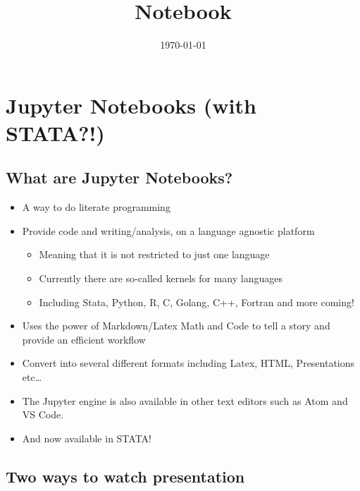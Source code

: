 \documentclass[10pt,parskip=half,
	toc=sectionentrywithdots,
	bibliography=totocnumbered,
	captions=tableheading,numbers=noendperiod]{scrartcl}
\providecommand{\tightlist}{%
  \setlength{\itemsep}{0pt}\setlength{\parskip}{0pt}}
\begin{document}
		\title{Notebook}
	\date{\today}
	\maketitle

		\begingroup
    \let\cleardoublepage\relax
    \let\clearpage\relax\tableofcontents
    \endgroup

\hypertarget{jupyter-notebooks-with-stata}{%
\section{Jupyter Notebooks (with
STATA?!)}\label{jupyter-notebooks-with-stata}}

\hypertarget{what-are-jupyter-notebooks}{%
\subsection{What are Jupyter
Notebooks?}\label{what-are-jupyter-notebooks}}

\begin{itemize}
\tightlist
\item
  A way to do literate programming
\item
  Provide code and writing/analysis, on a language agnostic platform

  \begin{itemize}
  \tightlist
  \item
    Meaning that it is not restricted to just one language
  \item
    Currently there are so-called kernels for many languages
  \item
    Including Stata, Python, R, C, Golang, C++, Fortran and more coming!
  \end{itemize}
\item
  Uses the power of Markdown/Latex Math and Code to tell a story and
  provide an efficient workflow
\item
  Convert into several different formats including Latex, HTML,
  Presentations etc\ldots{}
\item
  The Jupyter engine is also available in other text editors such as
  Atom and VS Code.
\item
  And now available in STATA!
\end{itemize}

\hypertarget{two-ways-to-watch-presentation}{%
\subsection{Two ways to watch
presentation}\label{two-ways-to-watch-presentation}}
\end{document}
